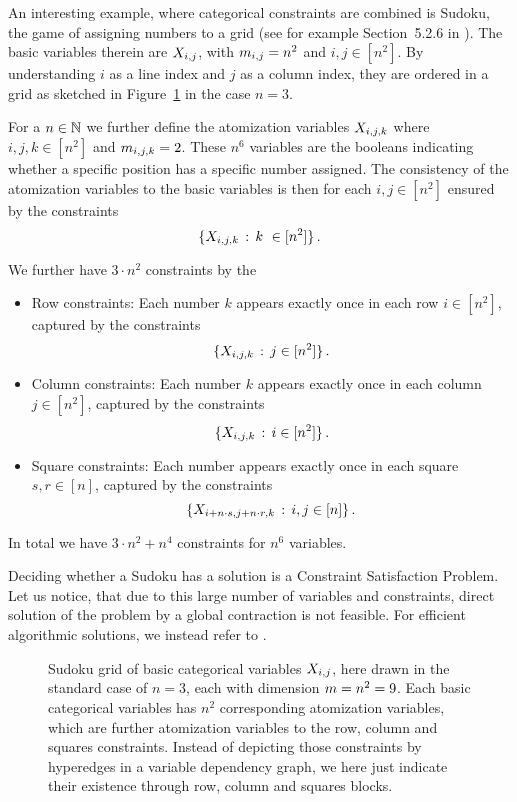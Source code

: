 \begin{example}[Sudoku]\label{exa:sudoku}
	An interesting example, where categorical constraints are combined is Sudoku, the game of assigning numbers to a grid (see for example Section~5.2.6 in \cite{russell_artificial_2021}).
	The basic variables therein are $X_{i,j}$, with $m_{i,j}=n^2$ and $i,j\in[n^2]$.
	By understanding $i$ as a line index and $j$ as a column index, they are ordered in a grid as sketched in Figure~\ref{fig:sudokuGrid} in the case $n=3$.

	For a $n\in\mathbb{N}$ we further define the atomization variables $X_{i,j,k}$ where $i,j,k\in[n^2]$ and $m_{i,j,k}=2$.
	These $n^6$ variables are the booleans indicating whether a specific position has a specific number assigned.
	The consistency of the atomization variables to the basic variables is then for each $i,j\in[n^2]$ ensured by the constraints
		\[ \{\catvariableof{i,j,k} \, : \, k \in [n^2] \} \, . \]

	We further have $3\cdot n^2$ constraints by the
	\begin{itemize}
		\item Row constraints: Each number $k$ appears exactly once in each row $i\in[n^2]$, captured by the constraints
			\[ \{X_{i,j,k}  \, : \, j \in [n^2] \} \, . \]
		\item Column constraints: Each number $k$ appears exactly once in each column $j\in[n^2]$, captured by the constraints
			\[ \{X_{i,j,k}  \, : \, i \in [n^2] \} \, . \]
		\item Square constraints: Each number appears exactly once in each square $s,r\in[n]$, captured by the constraints
			\[ \{X_{i+n\cdot s,j+n\cdot r,k}  \, : \, i,j \in [n] \} \, . \]
	\end{itemize}

	In total we have $3\cdot n^2 + n^4$ constraints for $n^6$ variables.

	Deciding whether a Sudoku has a solution is a Constraint Satisfaction Problem.
	Let us notice, that due to this large number of variables and constraints, direct solution of the problem by a global contraction is not feasible.
	For efficient algorithmic solutions, we instead refer to .

	\begin{figure}\label{fig:sudokuGrid}
	\begin{center}
		
	\end{center}
	\caption{
	Sudoku grid of basic categorical variables $X_{i,j}$, here drawn in the standard case of $n=3$, each with dimension $m=n^2=9$.
	Each basic categorical variables has $n^2$ corresponding atomization variables, which are further atomization variables to the row, column and squares constraints.
	Instead of depicting those constraints by hyperedges in a variable dependency graph, we here just indicate their existence through row, column and squares blocks.
	}
	\end{figure}
\end{example}




